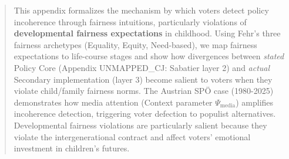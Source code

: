 

\begin{abstract}

This appendix formalizes the mechanism by which voters detect policy incoherence through
fairness intuitions, particularly violations of \textbf{developmental fairness expectations}
in childhood. Using Fehr's three fairness archetypes (Equality, Equity, Need-based),
we map fairness expectations to life-course stages and show how divergences between
\textit{stated} Policy Core (Appendix UNMAPPED_CJ: Sabatier layer 2) and \textit{actual} Secondary
implementation (layer 3) become salient to voters when they violate child/family fairness
norms. The Austrian SPÖ case (1980-2025) demonstrates how media attention (Context parameter $\Psi_{\text{media}}$)
amplifies incoherence detection, triggering voter defection to populist alternatives.
Developmental fairness violations are particularly salient because they violate the
intergenerational contract and affect voters' emotional investment in children's futures.

\end{abstract}


